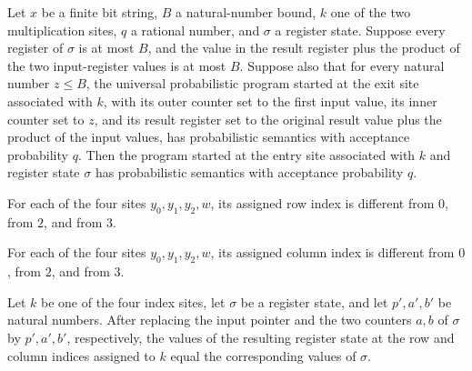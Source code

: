 \begin{lemma}
\label{Complexity.LogProg.ups_mul}
\leanok
{}
Let $x$ be a finite bit string, $B$ a natural-number bound, $k$ one of the two
multiplication sites, $q$ a rational number, and $\sigma$ a register state. Suppose
every register of $\sigma$ is at most $B$, and the value in the result register plus the
product of the two input-register values is at most $B$. Suppose also that for every
natural number $z\le B$, the universal probabilistic program started at the exit site
associated with $k$, with its outer counter set to the first input value, its inner
counter set to $z$, and its result register set to the original result value plus the
product of the input values, has probabilistic semantics with acceptance probability
$q$. Then the program started at the entry site associated with $k$ and register state
$\sigma$ has probabilistic semantics with acceptance probability $q$.
\end{lemma}

\begin{lemma}
\label{Complexity.LogProg.ixRow_ne}
\leanok
{}
For each of the four sites $y_0,y_1,y_2,w$, its assigned row index is different from
$0$, from $2$, and from $3$.
\end{lemma}

\begin{lemma}
\label{Complexity.LogProg.ixCol_ne}
\leanok
{}
For each of the four sites $y_0,y_1,y_2,w$, its assigned column index is different from
$0$, from $2$, and from $3$.
\end{lemma}

\begin{lemma}
\label{Complexity.LogProg.ix_v_upd}
\leanok
{}
Let $k$ be one of the four index sites, let $\sigma$ be a register state, and let
$p',a',b'$ be natural numbers. After replacing the input pointer and the two counters
$a,b$ of $\sigma$ by $p',a',b'$, respectively, the values of the resulting register
state at the row and column indices assigned to $k$ equal the corresponding values of
$\sigma$.
\end{lemma}

